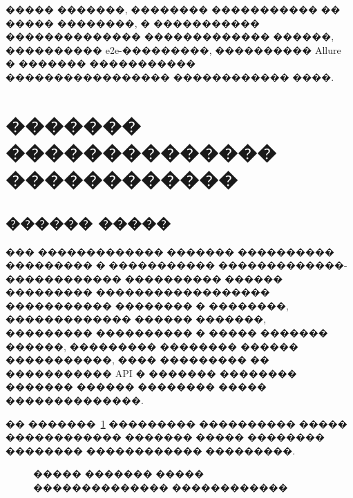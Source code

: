 ����� �������, �������� ����������� �� ����� ��������, � ����������� �������������� ������������� ������, ���������� e2e-���������, ���������� Allure � ������� ����������� ����������������� ������������ ����\cite{kulikov_testing_2024,kaner_testing_en,gost7052008}.

\section{������� �������������� ������������}

\subsection{������ �����}

��� ������������� ������� ���������� ��������� � ����������� �������������-������������ ���������� ������ ��������� ������������������ ����������� �������� � ��������, ������������� ������ �������, ��������� ���������� � ����� ������� ������, ��������� �������� ������ �����������, ���� ��������� �� ����������� API � ������� �������� ������� ������ �������� ����� ��������������\cite{gost509222006,gost250102015,proprofs_multitenant_lms_2025}.

�� �������~\ref{fig:ch3-threat-model} ��������� ���������� ����� ������������ ������� ����� �������� �������� ������������ ���������.

\begin{figure}[H]
\centering
{}
\caption{����� ������� ����� �������������� ������������}
\label{fig:ch3-threat-model}
\end{figure}

